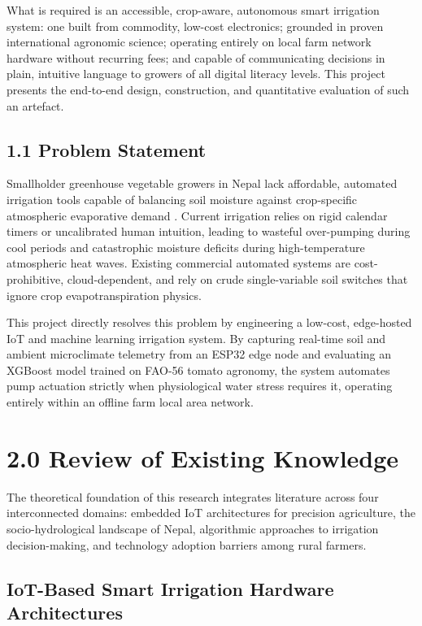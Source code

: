\documentclass[12pt, a4paper]{article}
\begin{document}
What is required is an accessible, crop-aware, autonomous smart irrigation system: one built from commodity, low-cost electronics; grounded in proven international agronomic science; operating entirely on local farm network hardware without recurring fees; and capable of communicating decisions in plain, intuitive language to growers of all digital literacy levels. This project presents the end-to-end design, construction, and quantitative evaluation of such an artefact.

\subsection{1.1 Problem Statement}
\label{sec:problem}

Smallholder greenhouse vegetable growers in Nepal lack affordable, automated irrigation tools capable of balancing soil moisture against crop-specific atmospheric evaporative demand \citep{kunwar2024}. Current irrigation relies on rigid calendar timers or uncalibrated human intuition, leading to wasteful over-pumping during cool periods and catastrophic moisture deficits during high-temperature atmospheric heat waves. Existing commercial automated systems are cost-prohibitive, cloud-dependent, and rely on crude single-variable soil switches that ignore crop evapotranspiration physics. 

This project directly resolves this problem by engineering a low-cost, edge-hosted IoT and machine learning irrigation system. By capturing real-time soil and ambient microclimate telemetry from an ESP32 edge node and evaluating an XGBoost model trained on FAO-56 tomato agronomy, the system automates pump actuation strictly when physiological water stress requires it, operating entirely within an offline farm local area network.

\section{2.0 Review of Existing Knowledge}
\label{sec:lit}

The theoretical foundation of this research integrates literature across four interconnected domains: embedded IoT architectures for precision agriculture, the socio-hydrological landscape of Nepal, algorithmic approaches to irrigation decision-making, and technology adoption barriers among rural farmers.

\subsection{IoT-Based Smart Irrigation Hardware Architectures}
\label{sec:iot}
\end{document}

